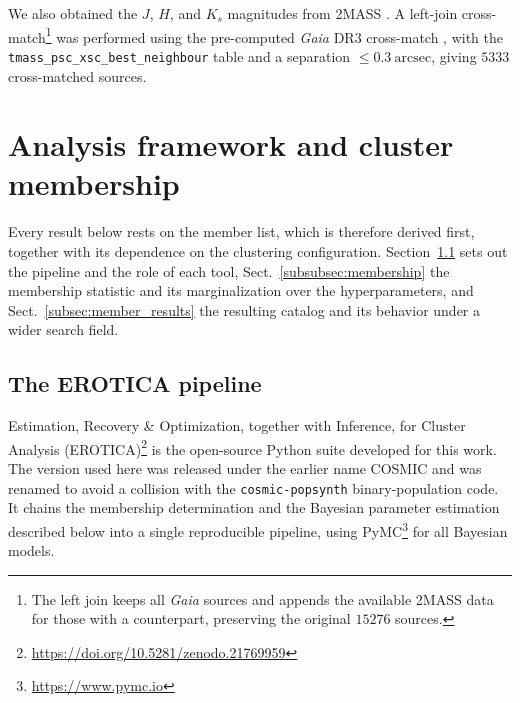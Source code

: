\documentclass{aa}
\begin{document}
We also obtained the $J$, $H$, and $K_s$ magnitudes from 2MASS \citep{2006AJ....131.1163S}. A left-join cross-match\footnote{The left join keeps all \textit{Gaia} sources and appends the available 2MASS data for those with a counterpart, preserving the original $15276$ sources.} was performed using the pre-computed \textit{Gaia} DR3 cross-match \citep{2022gdr3.reptE..15M}, with the \texttt{tmass\_psc\_xsc\_best\_neighbour} table and a separation $\leq0.3~\mathrm{arcsec}$, giving $5333$ cross-matched sources.

\section{Analysis framework and cluster membership}\label{sec:membership}\label{sec:methodology}
Every result below rests on the member list, which is therefore derived first, together with its dependence on the clustering configuration. Section~\ref{subsec:cosmic} sets out the pipeline and the role of each tool, Sect.~\ref{subsubsec:membership} the membership statistic and its marginalization over the hyperparameters, and Sect.~\ref{subsec:member_results} the resulting catalog and its behavior under a wider search field.

\subsection{The EROTICA pipeline}\label{subsec:cosmic}
Estimation, Recovery \& Optimization, together with Inference, for Cluster Analysis (EROTICA)\footnote{\url{https://doi.org/10.5281/zenodo.21769959}} is the open-source Python suite developed for this work. The version used here was released under the earlier name COSMIC and was renamed to avoid a collision with the \texttt{cosmic-popsynth} binary-population code. It chains the membership determination and the Bayesian parameter estimation described below into a single reproducible pipeline, using PyMC\footnote{\url{https://www.pymc.io}} \citep{pymc2023} for all Bayesian models.
\end{document}

